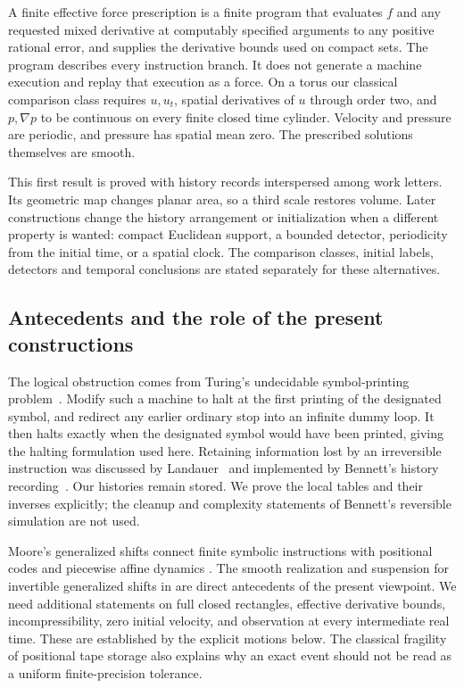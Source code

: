 A finite effective force prescription is a finite program that evaluates
$f$ and any requested mixed derivative at computably specified arguments
to any positive rational error, and supplies the derivative bounds used
on compact sets. The program describes every instruction branch. It does
not generate a machine execution and replay that execution as a force.
On a torus our classical comparison class requires $u,u_t$, spatial
derivatives of $u$ through order two, and $p,\nabla p$ to be continuous
on every finite closed time cylinder. Velocity and pressure are periodic,
and pressure has spatial mean zero. The prescribed solutions themselves
are smooth.



This first result is proved with history records interspersed among work
letters. Its geometric map changes planar area, so a third scale restores
volume. Later constructions change the history arrangement or initialization
when a different property is wanted: compact Euclidean support, a bounded
detector, periodicity from the initial time, or a spatial clock. The
comparison classes, initial labels, detectors and temporal conclusions are
stated separately for these alternatives.

\subsection{Antecedents and the role of the present constructions}
The logical obstruction comes from Turing's undecidable symbol-printing
problem~\cite[Section~8]{Turing1936}. Modify such a machine to halt at
the first printing of the designated symbol, and redirect any earlier
ordinary stop into an infinite dummy loop. It then halts exactly when
the designated symbol would have been printed, giving the halting
formulation used here. Retaining information lost by an irreversible instruction was
discussed by Landauer~\cite[Section~3]{Landauer1961} and implemented by
Bennett's history recording~\cite[Eqs.~(9)--(11)]{Bennett1973}. Our
histories remain stored. We prove the local tables and their inverses
explicitly; the cleanup and complexity statements of Bennett's reversible
simulation are not used.

Moore's generalized shifts connect finite symbolic instructions with
positional codes and piecewise affine dynamics
\cite{Moore1990,Moore1991}. The smooth realization and suspension for
invertible generalized shifts in
\cite[Section~6, Theorem~12 and its corollary]{Moore1991} are direct
antecedents of the present viewpoint. We need additional statements on
full closed rectangles, effective derivative bounds, incompressibility,
zero initial velocity, and observation at every intermediate real time.
These are established by the explicit motions below. The classical
fragility of positional tape storage also explains why an exact event
should not be read as a uniform finite-precision tolerance.

